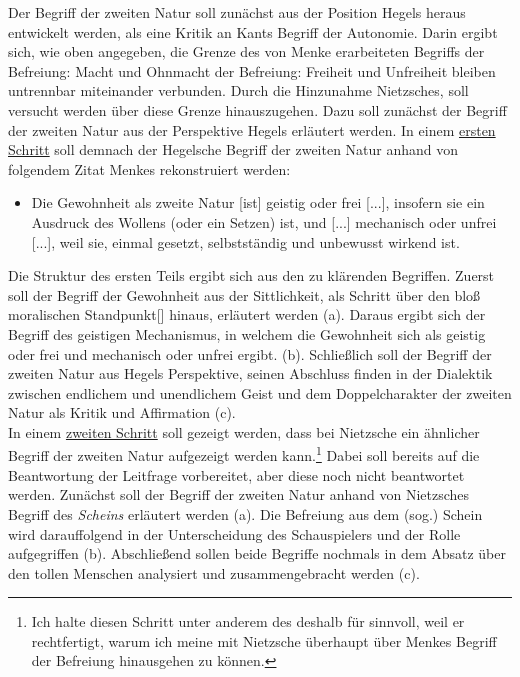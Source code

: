 \documentclass[12pt, a4paper, openany]{report}
\begin{document}
Der Begriff der zweiten Natur soll zunächst aus der Position Hegels heraus entwickelt werden, als eine Kritik an Kants Begriff der Autonomie. 
Darin ergibt sich, wie oben angegeben, die Grenze des von Menke erarbeiteten Begriffs der Befreiung:
Macht und Ohnmacht der Befreiung: Freiheit und Unfreiheit bleiben untrennbar miteinander verbunden.
Durch die Hinzunahme Nietzsches, soll versucht werden über diese Grenze hinauszugehen.
Dazu soll zunächst der Begriff der zweiten Natur aus der Perspektive Hegels erläutert werden. 
In einem \hyperref[abschnitt_1]{ersten Schritt} soll demnach der Hegelsche Begriff der zweiten Natur anhand von folgendem Zitat Menkes rekonstruiert werden:
\begin{itemize}
    \item[] Die Gewohnheit als zweite Natur [ist] geistig oder frei [...], insofern sie ein Ausdruck des Wollens (oder ein Setzen) ist, und [...] mechanisch oder unfrei [...], weil sie, einmal gesetzt, selbstständig und unbewusst wirkend ist.
\end{itemize}
Die Struktur des ersten Teils ergibt sich aus den zu klärenden Begriffen. 
Zuerst soll der Begriff der Gewohnheit aus der Sittlichkeit, als Schritt über den \glqq bloß moralischen Standpunkt[]\grqq{} hinaus, erläutert werden (a). 
Daraus ergibt sich der Begriff des \glqq geistigen Mechanismus\grqq, in welchem die Gewohnheit sich als \glqq geistig oder frei\grqq{} und \glqq mechanisch oder unfrei\grqq{} ergibt. (b).
Schließlich soll der Begriff der zweiten Natur aus Hegels Perspektive, seinen Abschluss finden in der Dialektik zwischen endlichem und unendlichem Geist und dem Doppelcharakter der zweiten Natur als Kritik und Affirmation (c).\\
In einem \hyperref[abschnitt_2]{zweiten Schritt} soll gezeigt werden, dass bei Nietzsche ein ähnlicher Begriff der zweiten Natur aufgezeigt werden kann.\footnote{Ich halte diesen Schritt unter anderem des deshalb für sinnvoll, weil er rechtfertigt, warum ich meine mit Nietzsche überhaupt über Menkes Begriff der Befreiung hinausgehen zu können.}
Dabei soll bereits auf die Beantwortung der Leitfrage vorbereitet, aber diese noch nicht beantwortet werden.
Zunächst soll der Begriff der zweiten Natur anhand von Nietzsches Begriff des \textit{Scheins} erläutert werden (a).
Die Befreiung aus dem (sog.) Schein wird darauffolgend in der Unterscheidung des Schauspielers und der Rolle aufgegriffen (b). 
Abschließend sollen beide Begriffe nochmals in dem Absatz über den tollen Menschen analysiert und zusammengebracht werden (c).
\end{document}
